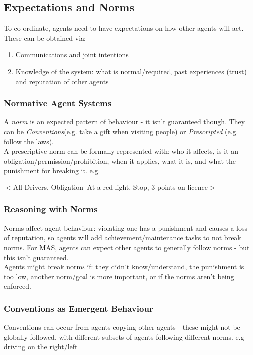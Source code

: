 \subsection{Expectations and Norms}
To co-ordinate, agents need to have expectations on how other agents will act. These can be obtained via:
\begin{enumerate}
    \item Communications and joint intentions
    \item Knowledge of the system: what is normal/required, past experiences (trust) and reputation of other agents
\end{enumerate}

\subsubsection{Normative Agent Systems}
A \emph{norm} is an expected pattern of behaviour - it isn't guaranteed though. They can be \emph{Conventions}(e.g. take a gift when visiting people) or \emph{Prescripted} (e.g. follow the laws). \\

A prescriptive norm can be formally represented with: who it affects, is it an obligation/permission/prohibition, when it applies, what it is, and what the punishment for breaking it. e.g. 
\begin{center}
    $<$All Drivers, Obligation, At a red light, Stop, 3 points on licence$>$ 
\end{center}
\subsubsection{Reasoning with Norms}
Norms affect agent behaviour: violating one has a punishment and causes a loss of reputation, so agents will add achievement/maintenance tasks to not break norms. For MAS, agents can expect other agents to generally follow norms - but this isn't guaranteed. \\

Agents might break norms if: they didn't know/understand, the punishment is too low, another norm/goal is more important, or if the norms aren't being enforced. \\

\subsubsection{Conventions as Emergent Behaviour}
Conventions can occur from agents copying other agents - these might not be globally followed, with different subsets of agents following different norms. e.g driving on the right/left\\


